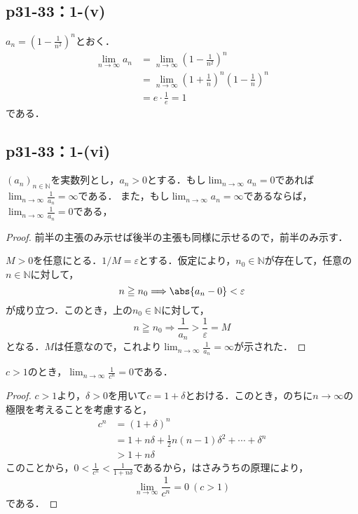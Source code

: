 \documentclass[a4paper,10pt,fleqn]{ltjsarticle}
\begin{document}
\subsection*{p31-33：1-(v)}
\begin{tleftbar}
      $a_n =\left (1-\frac{1}{n^2}\right)^n$とおく．
      \begin{align*}
        \lim_{n \to \infty} a_n & =\lim_{n \to \infty} \left (1-\frac{1}{n^2}\right)^n \\
        & = \lim_{n \to \infty} \left (1+\frac{1}{n}\right)^n \left (1-\frac{1}{n}\right)^n \\
        & = e \cdot \frac{1}{e} =1
      \end{align*}
      である．
\end{tleftbar}

\subsection*{p31-33：1-(vi)}


    $(a_n)_{n \in \mathbb{N}}$を実数列とし，$a_n > 0$とする．もし$\lim_{n \to \infty} a_n =0$であれば$\lim_{n \to \infty} \frac{1}{a_n}=\infty$である．
    また，もし$\lim_{n \to \infty} a_n =\infty$であるならば，$\lim_{n \to \infty} \frac{1}{a_n} =0$である，



\begin{proof}
    前半の主張のみ示せば後半の主張も同様に示せるので，前半のみ示す．
    
    $M>0$を任意にとる．$1/M = \varepsilon$とする．仮定により，$n_0 \in \mathbb{N}$が存在して，任意の$n \in \mathbb{N}$に対して，
    \[
        n \geqq n_0 \Longrightarrow \abs{a_n-0}<\varepsilon
    \]
    が成り立つ．このとき，上の$n_0 \in \mathbb{N}$に対して，
    \[
        n \geqq n_0 \Longrightarrow \frac{1}{a_n} >\frac{1}{\varepsilon}=M
    \]
    となる．$M$は任意なので，これより$\lim_{n \to \infty} \frac{1}{a_n}=\infty$が示された．
\end{proof}



    $c>1$のとき，$\lim_{n \to \infty} \frac{1}{c^n} = 0$である．

\begin{proof}
    $c>1$より，$\delta >0$を用いて$c=1+\delta$とおける．このとき，のちに$n \to \infty$の極限を考えることを考慮すると，
    \begin{align*}
        c^n &= (1+\delta)^n \\
        & = 1+n \delta +\frac{1}{2}n (n-1) \delta^2 + \cdots +\delta^n \\
        & > 1+n \delta
    \end{align*}
    このことから，$0<\frac{1}{c^n} <\frac{1}{1+n\delta}$であるから，はさみうちの原理により，
    \[
        \lim_{n \to \infty} \frac{1}{c^n} = 0~(c>1)
    \]
    である．
\end{proof}
\end{document}
